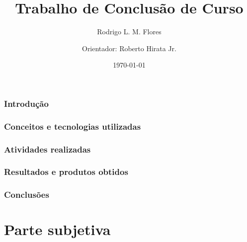 \documentclass[a4paper,12pt,titlepage]{article}
\title{Trabalho de Conclusão de Curso \\ }
\author{Rodrigo L. M. Flores \and
        Orientador: Roberto Hirata Jr. }
\date{\today}
\begin{document}
\maketitle

\tableofcontents

\nocite{wiki:volunteercomputing}
\nocite{wiki:interpretedlanguage}
\nocite{wiki:boinc}
\nocite{wiki:r}
\nocite{boinc_wrapper}
\nocite{hungaro}


\part{}

\section{Introdução}



\newpage

\section{Conceitos e tecnologias utilizadas}



\newpage

\section{Atividades realizadas}



\newpage

\section{Resultados e produtos obtidos}




\newpage

\section{Conclusões}



\newpage





\newpage


\part{Parte subjetiva}


\end{document}
